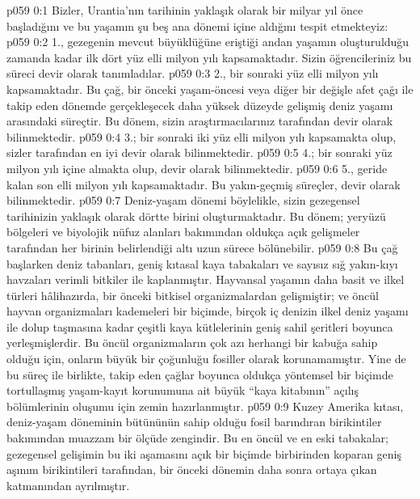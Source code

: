 \vs p059 0:1 Bizler, Urantia’nın tarihinin yaklaşık olarak bir milyar yıl önce başladığını ve bu yaşamın şu beş ana dönemi içine aldığını tespit etmekteyiz:
\vs p059 0:2 1., gezegenin mevcut büyüklüğüne eriştiği andan yaşamın oluşturulduğu zamanda kadar ilk dört yüz elli milyon yılı kapsamaktadır. Sizin öğrencileriniz bu süreci  devir olarak tanımladılar.
\vs p059 0:3 2.\bibnobreakspace {}, bir sonraki yüz elli milyon yılı kapsamaktadır. Bu çağ, bir önceki yaşam\hyp{}öncesi veya diğer bir değişle afet çağı ile takip eden dönemde gerçekleşecek daha yüksek düzeyde gelişmiş deniz yaşamı arasındaki süreçtir. Bu dönem, sizin araştırmacılarınız tarafından  devir olarak bilinmektedir.
\vs p059 0:4 3.\bibnobreakspace {}; bir sonraki iki yüz elli milyon yılı kapsamakta olup, sizler tarafından en iyi  devir olarak bilinmektedir.
\vs p059 0:5 4.\bibnobreakspace {}; bir sonraki yüz milyon yılı içine almakta olup,  devir olarak bilinmektedir.
\vs p059 0:6 5., geride kalan son elli milyon yılı kapsamaktadır. Bu yakın\hyp{}geçmiş süreçler,  devir olarak bilinmektedir.
\vs p059 0:7 Deniz\hyp{}yaşam dönemi böylelikle, sizin gezegensel tarihinizin yaklaşık olarak dörtte birini oluşturmaktadır. Bu dönem; yeryüzü bölgeleri ve biyolojik nüfuz alanları bakımından oldukça açık gelişmeler tarafından her birinin belirlendiği altı uzun sürece bölünebilir.
\vs p059 0:8 Bu çağ başlarken deniz tabanları, geniş kıtasal kaya tabakaları ve sayısız sığ yakın\hyp{}kıyı havzaları verimli bitkiler ile kaplanmıştır. Hayvansal yaşamın daha basit ve ilkel türleri hâlihazırda, bir önceki bitkisel organizmalardan gelişmiştir; ve öncül hayvan organizmaları kademeleri bir biçimde, birçok iç denizin ilkel deniz yaşamı ile dolup taşmasına kadar çeşitli kaya kütlelerinin geniş sahil şeritleri boyunca yerleşmişlerdir. Bu öncül organizmaların çok azı herhangi bir kabuğa sahip olduğu için, onların büyük bir çoğunluğu fosiller olarak korunamamıştır. Yine de bu süreç ile birlikte, takip eden çağlar boyunca oldukça yöntemsel bir biçimde tortullaşmış yaşam\hyp{}kayıt korunumuna ait büyük “kaya kitabının” açılış bölümlerinin oluşumu için zemin hazırlanmıştır.
\vs p059 0:9 Kuzey Amerika kıtası, deniz\hyp{}yaşam döneminin bütününün sahip olduğu fosil barındıran birikintiler bakımından muazzam bir ölçüde zengindir. Bu en öncül ve en eski tabakalar; gezegensel gelişimin bu iki aşamasını açık bir biçimde birbirinden koparan geniş aşınım birikintileri tarafından, bir önceki dönemin daha sonra ortaya çıkan katmanından ayrılmıştır.

